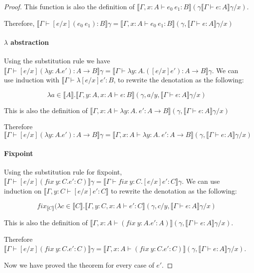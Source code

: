 \begin{proof}
This function is also the definition of $\llbracket \Gamma, x : A \vdash e_0 \ e_1 : B \rrbracket (\gamma \llbracket \Gamma \vdash e : A \rrbracket \gamma / x)$.

Therefore, $\llbracket \Gamma \vdash [e/x](e_0 \ e_1) : B \rrbracket \gamma = \llbracket \Gamma, x : A \vdash e_0 \ e_1 : B \rrbracket (\gamma, \llbracket \Gamma \vdash e : A \rrbracket \gamma / x)$


\paragraph{$\lambda$ abstraction} Using the substitution rule we have $\llbracket \Gamma \vdash [e/x](\lambda y : A.e') : A \to B \rrbracket \gamma = \llbracket \Gamma \vdash \lambda y : A. ([e/x] e') : A \to B \rrbracket \gamma$. We can use induction with $\llbracket \Gamma \vdash \lambda [e/x] e' : B$, to rewrite the denotation as the following:

 \[\lambda a \in \llbracket A \rrbracket . \llbracket \Gamma, y : A, x : A  \vdash e : B \rrbracket(\gamma, a/y , \llbracket \Gamma \vdash e : A \rrbracket \gamma / x)\]

This is also the definition of $\llbracket \Gamma, x : A \vdash \lambda y : A. \ e' : A \to B \rrbracket (\gamma, \llbracket \Gamma \vdash e : A \rrbracket \gamma / x)$

Therefore $\llbracket \Gamma \vdash [e/x](\lambda y : A.e') : A \to B \rrbracket \gamma = \llbracket \Gamma, x : A \vdash \lambda y : A. \ e' : A \to B \rrbracket (\gamma, \llbracket \Gamma \vdash e : A \rrbracket \gamma / x)$


\paragraph{Fixpoint} Using the substitution rule for fixpoint, $\llbracket \Gamma \vdash [e/x](fix \ y : C . e' : C) \rrbracket \gamma = \llbracket \Gamma \vdash fix \ y : C . [e/x]e' : C \rrbracket \gamma$. We can use induction on $\llbracket \Gamma, y : C \vdash [e/x]e' : C \rrbracket$ to rewrite the denotation as the following:

\[fix_{\llbracket C \rrbracket} (\lambda c \in \llbracket C \rrbracket . \llbracket \Gamma, y : C, x : A \vdash e' : C \rrbracket (\gamma, c/y, \llbracket \Gamma \vdash e : A \rrbracket \gamma / x)\] 

This is also the definition of $\llbracket \Gamma, x : A \vdash (fix \ y : A . e' : A) \rrbracket (\gamma, \llbracket \Gamma \vdash e : A \rrbracket \gamma / x)$.

Therefore $\llbracket \Gamma \vdash [e/x](fix \ y : C . e' : C) \rrbracket \gamma = \llbracket \Gamma, x : A \vdash (fix \ y : C . e' : C) \rrbracket (\gamma, \llbracket \Gamma \vdash e : A \rrbracket \gamma / x)$.

\vspace{0.25cm}

Now we have proved the theorem for every case of $e'$.
\end{proof}

